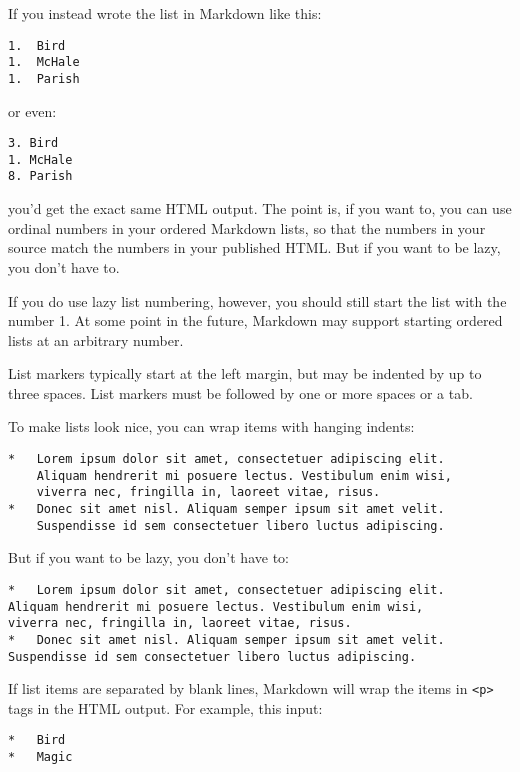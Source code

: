 If you instead wrote the list in Markdown like this:

\begin{verbatim}
1.  Bird
1.  McHale
1.  Parish
\end{verbatim}

or even:

\begin{verbatim}
3. Bird
1. McHale
8. Parish
\end{verbatim}

you'd get the exact same HTML output. The point is, if you want to,
you can use ordinal numbers in your ordered Markdown lists, so that
the numbers in your source match the numbers in your published HTML.
But if you want to be lazy, you don't have to.

If you do use lazy list numbering, however, you should still start the
list with the number 1. At some point in the future, Markdown may support
starting ordered lists at an arbitrary number.

List markers typically start at the left margin, but may be indented by
up to three spaces. List markers must be followed by one or more spaces
or a tab.

To make lists look nice, you can wrap items with hanging indents:

\begin{verbatim}
*   Lorem ipsum dolor sit amet, consectetuer adipiscing elit.
    Aliquam hendrerit mi posuere lectus. Vestibulum enim wisi,
    viverra nec, fringilla in, laoreet vitae, risus.
*   Donec sit amet nisl. Aliquam semper ipsum sit amet velit.
    Suspendisse id sem consectetuer libero luctus adipiscing.
\end{verbatim}

But if you want to be lazy, you don't have to:

\begin{verbatim}
*   Lorem ipsum dolor sit amet, consectetuer adipiscing elit.
Aliquam hendrerit mi posuere lectus. Vestibulum enim wisi,
viverra nec, fringilla in, laoreet vitae, risus.
*   Donec sit amet nisl. Aliquam semper ipsum sit amet velit.
Suspendisse id sem consectetuer libero luctus adipiscing.
\end{verbatim}

If list items are separated by blank lines, Markdown will wrap the
items in \texttt{<p>} tags in the HTML output. For example, this input:

\begin{verbatim}
*   Bird
*   Magic
\end{verbatim}

